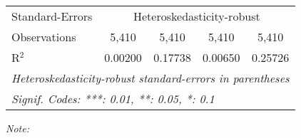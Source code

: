 \begin{table}[htbp!]
\begin{adjustbox}{width = 1\textwidth, max height = 0.95\textheight, center}
\begin{threeparttable}[b]
\begin{tabular}{lcccc}
            Standard-Errors & \multicolumn{4}{c}{Heteroskedasticity-robust} \\ 
            Observations         & 5,410                    & 5,410                          & 5,410                          & 5,410\\  
            R$^2$                & 0.00200                  & 0.17738                        & 0.00650                        & 0.25726\\  
            \midrule \midrule
            \multicolumn{5}{l}{\emph{Heteroskedasticity-robust standard-errors in parentheses}}\\
            \multicolumn{5}{l}{\emph{Signif. Codes: ***: 0.01, **: 0.05, *: 0.1}}\\
         \end{tabular}
         
         \begin{tablenotes}\item \medskip \textit{Note:}
         \end{tablenotes}
      \end{threeparttable}
   \end{adjustbox}
\end{table}



